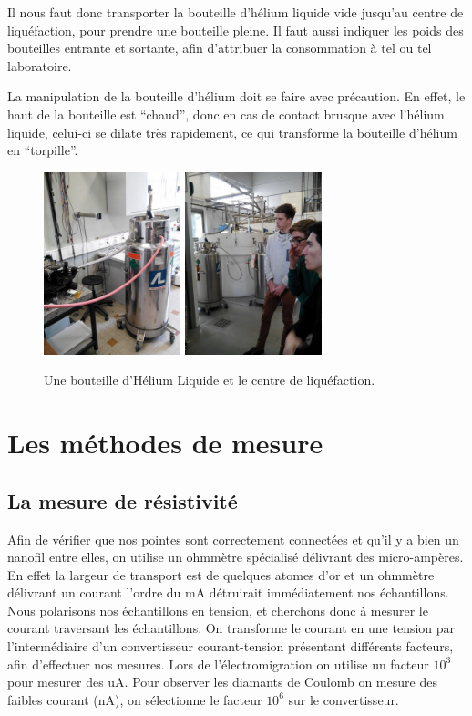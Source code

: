 Il nous faut donc transporter la bouteille d'hélium liquide vide jusqu'au centre de liquéfaction, pour prendre une bouteille pleine. Il faut aussi indiquer les poids des bouteilles entrante et sortante, afin d'attribuer la consommation à tel ou tel laboratoire.

La manipulation de la bouteille d'hélium doit se faire avec précaution. En effet, le haut de la bouteille est “chaud”, donc en cas de contact brusque avec l'hélium liquide, celui-ci se dilate très rapidement, ce qui transforme la bouteille d'hélium en “torpille”.
\begin{figure}[h]
    \begin{center}
        \includegraphics[width=150px]{Images/3_Bouteille_Helium_Liquide.jpg}
        \includegraphics[width=150px]{Images/3_Centre_Helium_Liquide.jpg}
        \caption{Une bouteille d'Hélium Liquide et le centre de liquéfaction.}
    \end{center}
\end{figure}

\section{Les méthodes de mesure}
\subsection{La mesure de résistivité}
Afin de vérifier que nos pointes sont correctement connectées et qu'il y a bien un nanofil entre elles, on utilise un ohmmètre spécialisé délivrant des micro-ampères. En effet la largeur de transport est de quelques atomes d'or et un ohmmètre délivrant un courant l'ordre du mA détruirait immédiatement nos échantillons.
Nous polarisons nos échantillons en tension, et cherchons donc à mesurer le courant traversant les échantillons.
On transforme le courant en une tension par l'intermédiaire d'un convertisseur courant-tension présentant différents facteurs, afin d'effectuer nos mesures. Lors de l'électromigration on utilise un facteur $10^3$ pour mesurer des uA.
Pour observer les diamants de Coulomb on mesure des faibles courant (nA), on sélectionne le facteur $10^6$ sur le convertisseur. 

